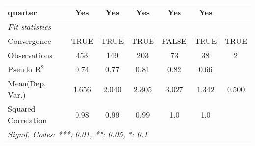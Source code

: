 \begin{tabular}{lcccccc}
   quarter                                                    & Yes          & Yes       & Yes         & Yes              & Yes            & \\  
   \midrule
   \emph{Fit statistics}\\
   Convergence                                                &TRUE          & TRUE      & TRUE        & FALSE            & TRUE           & TRUE\\  
   Observations                                               & 453          & 149       & 203         & 73               & 38             & 2\\  
   Pseudo R$^2$                                               & 0.74         & 0.77      & 0.81        & 0.82             & 0.66           & \\  
Mean(Dep. Var.) & 1.656 & 2.040 & 2.305 & 3.027 & 1.342 & 0.500 \\
   Squared Correlation                                        & 0.98         & 0.99      & 0.99        & 1.0              & 1.0            & \\  
   \midrule \midrule
   \multicolumn{7}{l}{\emph{Signif. Codes: ***: 0.01, **: 0.05, *: 0.1}}\\
\end{tabular}
\par\endgroup
